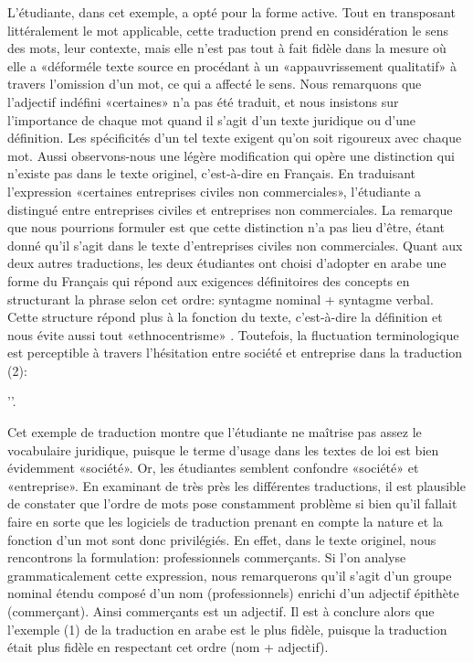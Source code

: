 \documentclass{textolivre}
\begin{document}
L’étudiante, dans cet exemple, a opté pour la forme active. Tout en transposant littéralement le mot applicable, cette traduction prend en considération le sens des mots, leur contexte, mais elle n’est pas tout à fait fidèle dans la mesure où elle a «déforméle texte source en procédant à un «appauvrissement qualitatif» \cite{berman1984} à travers l’omission d’un mot, ce qui a affecté le sens. Nous remarquons que l’adjectif indéfini «certaines» n’a pas été traduit, et nous insistons sur l’importance de chaque mot quand il s’agit d’un texte juridique ou d’une définition. Les spécificités d’un tel texte exigent qu’on soit rigoureux avec chaque mot. Aussi observons-nous une légère modification qui opère une distinction qui n’existe pas dans le texte originel, c’est-à-dire en Français. En traduisant l’expression «certaines entreprises civiles non commerciales», l’étudiante a distingué entre entreprises civiles et entreprises non commerciales. La remarque que nous pourrions formuler est que cette distinction n’a pas lieu d’être, étant donné qu’il s’agit dans le texte d’entreprises civiles non commerciales.  Quant aux deux autres traductions, les deux étudiantes ont choisi d’adopter en arabe une forme du Français qui répond aux exigences définitoires des concepts en structurant la phrase selon cet ordre: syntagme nominal + syntagme verbal. Cette structure répond plus à la fonction du texte, c’est-à-dire la définition et nous évite aussi tout «ethnocentrisme» \cite{berman1984}. Toutefois, la fluctuation terminologique est perceptible à travers l’hésitation entre société et entreprise dans la traduction (2):

''.

Cet exemple de traduction montre que l’étudiante ne maîtrise pas assez le vocabulaire juridique, puisque le terme d’usage dans les textes de loi est bien évidemment «société». Or, les étudiantes semblent confondre «société» et «entreprise». En examinant de très près les différentes traductions, il est plausible de constater que l’ordre de mots pose constamment problème si bien qu’il fallait faire en sorte que les logiciels de traduction prenant en compte la nature et la fonction d’un mot sont donc privilégiés. En effet, dans le texte originel, nous rencontrons la formulation: professionnels commerçants. Si l’on analyse grammaticalement cette expression, nous remarquerons qu’il s’agit d’un groupe nominal étendu composé d’un nom (professionnels) enrichi d’un adjectif épithète (commerçant). Ainsi commerçants est un adjectif. Il est à conclure alors que l’exemple (1) de la traduction en arabe est le plus fidèle, puisque la traduction était plus fidèle en respectant cet ordre (nom + adjectif).  
\end{document}
